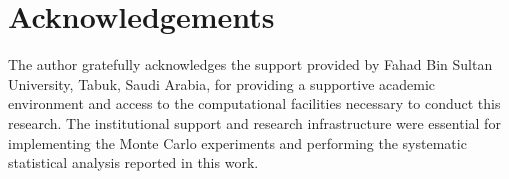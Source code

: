 \documentclass[a4paper,fleqn]{cas-sc}
\begin{document}
\section*{Acknowledgements}
The author gratefully acknowledges the support provided by Fahad Bin Sultan University, Tabuk, Saudi Arabia, for providing a supportive academic environment and access to the computational facilities necessary to conduct this research. The institutional support and research infrastructure were essential for implementing the Monte Carlo experiments and performing the systematic statistical analysis reported in this work.

\printcredits



\end{document}

